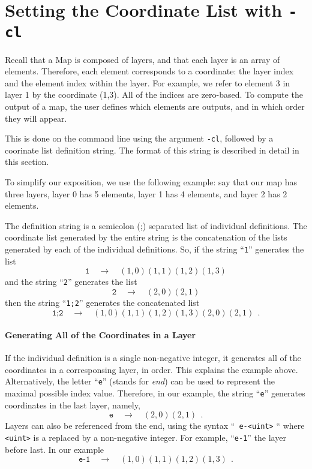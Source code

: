 \section{Setting the Coordinate List with {\tt -cl}}
Recall that a Map is composed of layers, and that each layer is an
array of elements. Therefore, each element corresponds to a
coordinate: the layer index and the element index within the
layer. For example, we refer to element 3 in layer 1 by the coordinate
(1,3). All of the indices are zero-based. To compute the output of a
map, the user defines which elements are outputs, and in which order
they will appear.

This is done on the command line using the argument {\tt -cl},
followed by a coorinate list definition string. The format of this
string is described in detail in this section.

To simplify our exposition, we use the following example: say that our
map has three layers, layer 0 has 5 elements, layer 1 has 4 elements,
and layer 2 has 2 elements.

The definition string is a semicolon (;) separated list of individual
definitions. The coordinate list generated by the entire string is the
concatenation of the lists generated by each of the individual
definitions. So, if the string ``{\tt 1}'' generates the list
$$
\texttt{1} \quad\rightarrow\quad (1,0) (1,1) (1,2) (1,3)
$$
and the string ``{\tt 2}'' generates the list
$$
\texttt{2} \quad\rightarrow\quad (2,0) (2,1)
$$
then the string ``{\tt 1;2}'' generates the concatenated list 
$$
\texttt{1;2} \quad\rightarrow\quad (1,0) (1,1) (1,2) (1,3) (2,0) (2,1)~~.
$$ 
%

\paragraph{Generating All of the Coordinates in a Layer}
If the individual definition is a single non-negative integer, it
generates all of the coordinates in a corresponsing layer, in
order. This explains the example above. Alternatively, the letter
``{\tt e}'' (stands for \emph{end}) can be used to represent the
maximal possible index value. Therefore, in our example, the string
``{\tt e}'' generates coordinates in the last layer, namely, 
$$
\texttt{e} \quad\rightarrow\quad (2,0) (2,1)~~.
$$ 
%
Layers can also be referenced from the end, using the syntax ``{\tt
  e-<uint>} `` where {\tt <uint>} is a replaced by a non-negative
integer. For example, ``{\tt e-1}'' the layer before last. In our
example
%
$$
\texttt{e-1} \quad\rightarrow\quad (1,0) (1,1) (1,2) (1,3)~~.
$$ 

